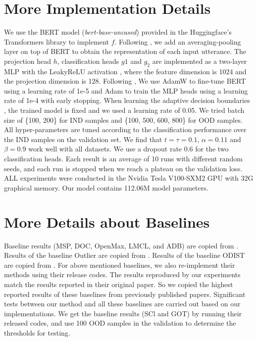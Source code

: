 \documentclass[11pt]{article}
\begin{document}
\section{More Implementation Details}\label{append:implementation_details}

We use the BERT model (\textit{bert-base-uncased}) provided in the Huggingface’s Transformers library \citep{wolf2020transformers} to implement $f$. Following \citep{zhang2021deep}, we add an averaging-pooling layer on top of BERT to obtain the representation of each input utterance. The projection head $h$, classification heads $g1$ and $g_2$ are implemented as a two-layer MLP with the LeakyReLU activation \cite{xu2020reluplex}, where the feature dimension is 1024 and the projection dimension is 128. Following \citep{zhan2021out}, We use AdamW \citep{kingma2014adam} to fine-tune BERT using a learning rate of 1e-5 and Adam \citep{wolf2019huggingface} to train the MLP heads using a learning rate of 1e-4 with early stopping. When learning the adaptive decision boundaries \citep{zhang2021deep}, the trained model is fixed and we used a learning rate of 0.05. We tried batch size of \{100, 200\} for IND samples and \{100, 500, 600, 800\} for OOD samples. All hyper-parameters are tuned according to the classification performance over the IND samples on the validation set. We find that $t=\tau=0.1$, $\alpha=0.11$ and $\beta=0.9$ work well with all datasets. We use a dropout rate 0.6 for the two classification heads. Each result is an average of 10 runs with different random seeds, and each run is stopped when we reach a plateau on the validation loss. ALL experiments were conducted in the Nvidia Tesla V100-SXM2 GPU with 32G graphical memory. Our model contains 112.06M model parameters.

\section{More Details about Baselines}\label{append:baseline}
Baseline results (MSP, DOC, OpenMax, LMCL, and ADB) are copied from \citep{zhang2021deep}. Results of the baseline Outlier are copied from \citep{zhan2021out}. Results of the baseline ODIST are copied from \citep{shu2021odist}. 
For above mentioned baselines, we also re-implement their methods using their release codes.
The results reproduced by our experiments match the results reported in their original paper.
So we copied the highest reported results of these baselines from previously published papers.
Significant tests between our method and all these baselines are carried out based on our implementations.
We get the baseline results (SCl and GOT) by running their released codes, and use 100 OOD samples in the validation to determine the thresholds for testing.
\end{document}
